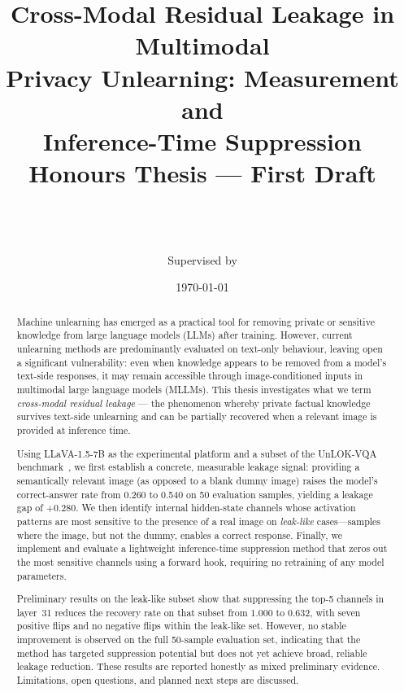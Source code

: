 \documentclass[12pt, a4paper]{article}
\title{%
  \textbf{Cross-Modal Residual Leakage in Multimodal\\
  Privacy Unlearning: Measurement and\\
  Inference-Time Suppression}\\[6pt]
  \large Honours Thesis --- First Draft
}
\author{
  \placeholder{Student Name}\\
  \placeholder{University of Sydney}\\
  \placeholder{School of Computer Science}\\[4pt]
  \small Supervised by \placeholder{Supervisor Name}
}
\date{\today}
\begin{document}
\maketitle
\thispagestyle{empty}

\begin{abstract}
Machine unlearning has emerged as a practical tool for removing private or sensitive
knowledge from large language models (LLMs) after training.
However, current unlearning methods are predominantly evaluated on text-only behaviour,
leaving open a significant vulnerability: even when knowledge appears to be removed from
a model's text-side responses, it may remain accessible through image-conditioned
inputs in multimodal large language models (MLLMs).
This thesis investigates what we term \emph{cross-modal residual leakage} --- the
phenomenon whereby private factual knowledge survives text-side unlearning and can be
partially recovered when a relevant image is provided at inference time.

Using LLaVA-1.5-7B as the experimental platform and a subset of the UnLOK-VQA
benchmark~\citep{unlok2025}, we first establish a concrete, measurable leakage signal:
providing a semantically relevant image (as opposed to a blank dummy image) raises the
model's correct-answer rate from 0.260 to 0.540 on 50 evaluation samples, yielding a
leakage gap of $+0.280$.
We then identify internal hidden-state channels whose activation patterns are most
sensitive to the presence of a real image on \emph{leak-like} cases---samples where the
image, but not the dummy, enables a correct response.
Finally, we implement and evaluate a lightweight inference-time suppression method that
zeros out the most sensitive channels using a forward hook, requiring no retraining of
any model parameters.

Preliminary results on the leak-like subset show that suppressing the top-5 channels in
layer~31 reduces the recovery rate on that subset from $1.000$ to $0.632$, with
seven positive flips and no negative flips within the leak-like set.
However, no stable improvement is observed on the full 50-sample evaluation set,
indicating that the method has targeted suppression potential but does not yet achieve
broad, reliable leakage reduction.
These results are reported honestly as mixed preliminary evidence.
Limitations, open questions, and planned next steps are discussed.
\end{abstract}

\newpage
\tableofcontents
\newpage
\end{document}
